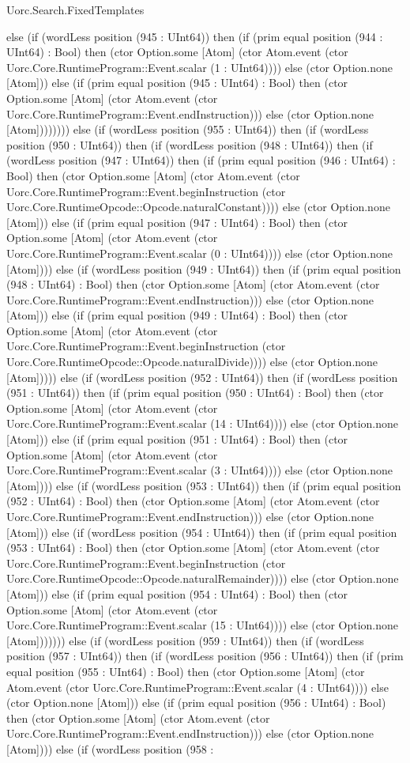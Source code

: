 \begin{lexlean}{Uorc.Search.FixedTemplates}
\begin{semanticmodule}
{else (if (wordLess position (945 : UInt64)) then (if (prim equal position (944 : UInt64) : Bool) then (ctor Option.some [Atom] (ctor Atom.event (ctor Uorc.Core.RuntimeProgram::Event.scalar (1 : UInt64)))) else (ctor Option.none [Atom])) else (if (prim equal position (945 : UInt64) : Bool) then (ctor Option.some [Atom] (ctor Atom.event (ctor Uorc.Core.RuntimeProgram::Event.endInstruction))) else (ctor Option.none [Atom]))))))) else (if (wordLess position (955 : UInt64)) then (if (wordLess position (950 : UInt64)) then (if (wordLess position (948 : UInt64)) then (if (wordLess position (947 : UInt64)) then (if (prim equal position (946 : UInt64) : Bool) then (ctor Option.some [Atom] (ctor Atom.event (ctor Uorc.Core.RuntimeProgram::Event.beginInstruction (ctor Uorc.Core.RuntimeOpcode::Opcode.naturalConstant)))) else (ctor Option.none [Atom])) else (if (prim equal position (947 : UInt64) : Bool) then (ctor Option.some [Atom] (ctor Atom.event (ctor Uorc.Core.RuntimeProgram::Event.scalar (0 : UInt64)))) else (ctor Option.none [Atom]))) else (if (wordLess position (949 : UInt64)) then (if (prim equal position (948 : UInt64) : Bool) then (ctor Option.some [Atom] (ctor Atom.event (ctor Uorc.Core.RuntimeProgram::Event.endInstruction))) else (ctor Option.none [Atom])) else (if (prim equal position (949 : UInt64) : Bool) then (ctor Option.some [Atom] (ctor Atom.event (ctor Uorc.Core.RuntimeProgram::Event.beginInstruction (ctor Uorc.Core.RuntimeOpcode::Opcode.naturalDivide)))) else (ctor Option.none [Atom])))) else (if (wordLess position (952 : UInt64)) then (if (wordLess position (951 : UInt64)) then (if (prim equal position (950 : UInt64) : Bool) then (ctor Option.some [Atom] (ctor Atom.event (ctor Uorc.Core.RuntimeProgram::Event.scalar (14 : UInt64)))) else (ctor Option.none [Atom])) else (if (prim equal position (951 : UInt64) : Bool) then (ctor Option.some [Atom] (ctor Atom.event (ctor Uorc.Core.RuntimeProgram::Event.scalar (3 : UInt64)))) else (ctor Option.none [Atom]))) else (if (wordLess position (953 : UInt64)) then (if (prim equal position (952 : UInt64) : Bool) then (ctor Option.some [Atom] (ctor Atom.event (ctor Uorc.Core.RuntimeProgram::Event.endInstruction))) else (ctor Option.none [Atom])) else (if (wordLess position (954 : UInt64)) then (if (prim equal position (953 : UInt64) : Bool) then (ctor Option.some [Atom] (ctor Atom.event (ctor Uorc.Core.RuntimeProgram::Event.beginInstruction (ctor Uorc.Core.RuntimeOpcode::Opcode.naturalRemainder)))) else (ctor Option.none [Atom])) else (if (prim equal position (954 : UInt64) : Bool) then (ctor Option.some [Atom] (ctor Atom.event (ctor Uorc.Core.RuntimeProgram::Event.scalar (15 : UInt64)))) else (ctor Option.none [Atom])))))) else (if (wordLess position (959 : UInt64)) then (if (wordLess position (957 : UInt64)) then (if (wordLess position (956 : UInt64)) then (if (prim equal position (955 : UInt64) : Bool) then (ctor Option.some [Atom] (ctor Atom.event (ctor Uorc.Core.RuntimeProgram::Event.scalar (4 : UInt64)))) else (ctor Option.none [Atom])) else (if (prim equal position (956 : UInt64) : Bool) then (ctor Option.some [Atom] (ctor Atom.event (ctor Uorc.Core.RuntimeProgram::Event.endInstruction))) else (ctor Option.none [Atom]))) else (if (wordLess position (958 : }
\end{semanticmodule}
\end{lexlean}
